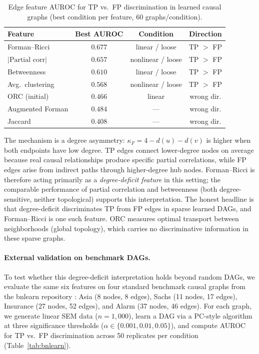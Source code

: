 \documentclass[11pt]{article}
\begin{document}
\begin{table}[t]
\centering
\caption{Edge feature AUROC for TP vs.\ FP discrimination in learned causal graphs (best condition per feature, 60 graphs/condition).}
\label{tab:curvature}
\small
\begin{tabular}{@{}lccc@{}}
\toprule
\textbf{Feature} & \textbf{Best AUROC} & \textbf{Condition} & \textbf{Direction} \\
\midrule
Forman--Ricci & $\mathbf{0.677}$ & linear / loose & TP $>$ FP \\
$|\text{Partial corr}|$ & $0.657$ & nonlinear / loose & TP $>$ FP \\
Betweenness & $0.610$ & linear / loose & TP $>$ FP \\
Avg.\ clustering & $0.568$ & nonlinear / loose & TP $>$ FP \\
\midrule
ORC (initial) & $0.466$ & linear & wrong dir. \\
Augmented Forman & $0.484$ & --- & wrong dir. \\
Jaccard & $0.408$ & --- & wrong dir. \\
\bottomrule
\end{tabular}
\end{table}

The mechanism is a degree asymmetry: $\kappa_F = 4 - d(u) - d(v)$ is higher when both endpoints have low degree.
TP edges connect lower-degree nodes on average because real causal relationships produce specific partial correlations, while FP edges arise from indirect paths through higher-degree hub nodes.
Forman--Ricci is therefore acting primarily as a \emph{degree-deficit feature} in this setting; the comparable performance of partial correlation and betweenness (both degree-sensitive, neither topological) supports this interpretation.
The honest headline is that degree-deficit discriminates TP from FP edges in sparse learned DAGs, and Forman--Ricci is one such feature.
ORC measures optimal transport between neighborhoods (global topology), which carries no discriminative information in these sparse graphs.

\paragraph{External validation on benchmark DAGs.}
To test whether this degree-deficit interpretation holds beyond random DAGs, we evaluate the same six features on four standard benchmark causal graphs from the bnlearn repository \citep{scutari2010learning}: Asia (8 nodes, 8 edges), Sachs (11 nodes, 17 edges), Insurance (27 nodes, 52 edges), and Alarm (37 nodes, 46 edges). For each graph, we generate linear SEM data ($n = 1{,}000$), learn a DAG via a PC-style algorithm at three significance thresholds ($\alpha \in \{0.001, 0.01, 0.05\}$), and compute AUROC for TP vs.\ FP discrimination across 50 replicates per condition (Table~\ref{tab:bnlearn}).
\end{document}
